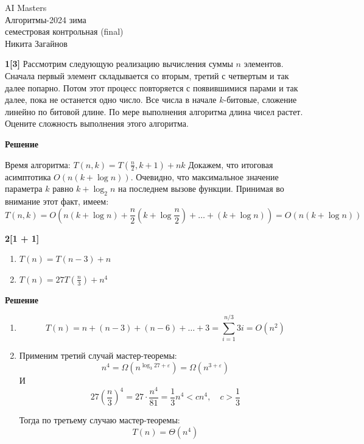 \documentclass{article}
\begin{document}
\begin{center}
	\Large {AI Masters \\
		Алгоритмы-2024 зима \\
		семестровая контрольная (final) \\
		Никита Загайнов}
\end{center}

\bigskip

\textbf{1[3]} Рассмотрим следующую реализацию вычисления суммы $n$ элементов. Сначала первый элемент складывается со вторым, третий с четвертым и так далее попарно. Потом этот процесс повторяется с появившимися парами и так далее, пока не останется одно число. Все числа в начале $k$-битовые, сложение линейно по битовой длине. По мере выполнения алгоритма длина чисел растет. Оцените сложность выполнения этого алгоритма.

\medskip

\textbf{Решение}

\medskip

Время алгоритма: $T(n, k) = T(\frac{n}{2}, k + 1) + nk$
Докажем, что итоговая асимптотика $O(n(k + \log n))$. Очевидно, что
максимальное значение параметра $k$ равно $k + \log_2 n$ на последнем
вызове функции. Принимая во внимание этот факт, имеем:
\[
	T(n, k) =
	O(n(k + \log n) + \frac{n}{2}(k +  \log \frac{n}{2}) +
	\ldots + (k + \log n)) = O(n(k + \log n))
\]

\medskip

\textbf{2[1 + 1]}

\begin{enumerate}
	\item $T(n) = T(n - 3) + n$
	\item $T(n) = 27 T(\frac{n}{3}) + n^4$
\end{enumerate}

\medskip

\textbf{Решение}

\medskip

\begin{enumerate}
	\item \[
		      T(n) = n + (n - 3) + (n - 6) + \ldots + 3 =
		      \sum_{i = 1}^{n / 3} 3i = O(n^2)
	      \]

	\item Применим третий случай мастер-теоремы:
	      \[
		      n^4 = \Omega (n^{\log_3 27 + \varepsilon}) = \Omega(n^{3 + \varepsilon})
	      \]
	      И
	      \[
		      27 \left(\frac{n}{3}\right)^4 = 27 \cdot \frac{n^4}{81} = \frac{1}{3} n^4 < cn^4, \quad c > \frac{1}{3}
	      \]

	      Тогда по третьему случаю мастер-теоремы:
	      \[
		      T(n) = \Theta(n^4)
	      \]
\end{enumerate}
\end{document}
